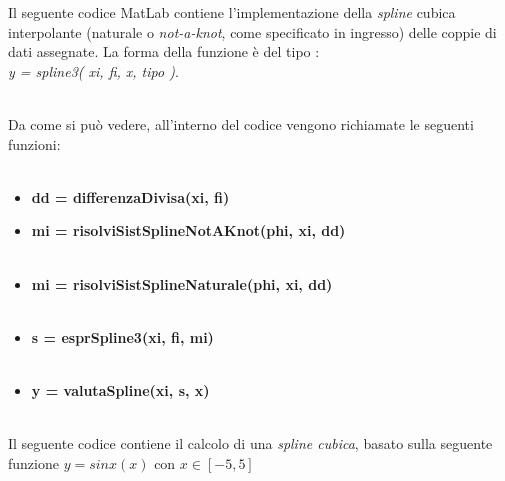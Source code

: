 Il seguente codice MatLab contiene l'implementazione della \textit{spline} cubica interpolante (naturale o \textit{not-a-knot}, come specificato in ingresso) delle coppie di dati assegnate. La forma della funzione è del tipo :\\ \textit{y = spline3( xi, fi, x, tipo )}.\\\
	
Da come si può vedere, all'interno del codice vengono richiamate le seguenti funzioni:\\\ 
	\begin{itemize}
		\item \textbf{dd = differenzaDivisa(xi, fi)}
	    	
		\item \textbf{mi = risolviSistSplineNotAKnot(phi, xi, dd)}\\\
	    	
		\item \textbf{mi = risolviSistSplineNaturale(phi, xi, dd)}\\\
	      	
		\item \textbf{s = esprSpline3(xi, fi, mi)}\\\
	    	
		\item \textbf{y = valutaSpline(xi, s, x)}\\\
	      	
	\end{itemize}
Il seguente codice contiene il calcolo di una \textit{spline cubica}, basato sulla seguente funzione $y = sinx(x)$ con $x \in [-5,5]$\\\
	

	\begin{figure}[H]	
	\end{figure}